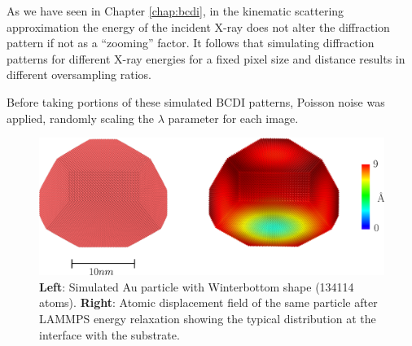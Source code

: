 As we have seen in Chapter \ref{chap:bcdi}, in the kinematic scattering 
approximation the energy of the incident X-ray does not alter the diffraction pattern if not as a ``zooming'' factor. 
It follows that simulating diffraction patterns for different X-ray energies for a fixed pixel size and distance results 
in different oversampling ratios. 

Before taking portions of these simulated BCDI patterns, Poisson noise was applied, randomly scaling the $\lambda$ parameter
for each image.



\begin{figure}[h]
    \centering
    \includegraphics[width=\textwidth]{figures/Inpainting/ovitos.pdf}
    \caption{\textbf{Left}: Simulated Au particle with Winterbottom shape (134114 atoms). 
        \textbf{Right}: Atomic displacement field of the same particle after LAMMPS energy relaxation showing 
        the typical distribution at the interface with the substrate.}
     \label{fig:comparison}
\end{figure}

